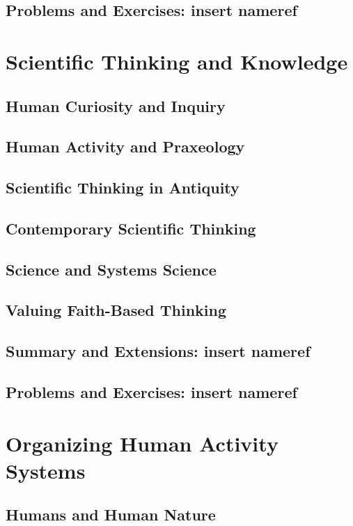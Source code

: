 \documentclass[11pt,fleqn]{book} %
\begin{document}
    \section{Problems and Exercises: insert nameref}
    
  \chapter{Scientific Thinking and Knowledge}
    \section{Human Curiosity and Inquiry}
    \section{Human Activity and Praxeology}
    \section{Scientific Thinking in Antiquity}
    \section{Contemporary Scientific Thinking}
    \section{Science and Systems Science}
	\section{Valuing Faith-Based Thinking}
	\section{Summary and Extensions: insert nameref}
	\section{Problems and Exercises: insert nameref}
  
  \chapter{Organizing Human Activity Systems}
    \section{Humans and Human Nature}
\end{document}
